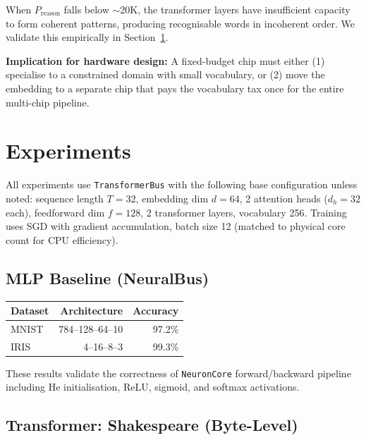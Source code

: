 \documentclass[11pt]{article}
\begin{document}
When $P_{\text{reason}}$ falls below $\sim$20K, the transformer layers have insufficient
capacity to form coherent patterns, producing recognisable words in incoherent order.
We validate this empirically in Section~\ref{sec:experiments}.

\textbf{Implication for hardware design:} A fixed-budget chip must either (1) specialise
to a constrained domain with small vocabulary, or (2) move the embedding to a separate chip
that pays the vocabulary tax once for the entire multi-chip pipeline.

\section{Experiments}

\label{sec:experiments}

All experiments use \texttt{TransformerBus} with the following base configuration
unless noted: sequence length $T=32$, embedding dim $d=64$, 2 attention heads
($d_h=32$ each), feedforward dim $f=128$, 2 transformer layers, vocabulary 256.
Training uses SGD with gradient accumulation, batch size 12 (matched to physical
core count for CPU efficiency).

\subsection{MLP Baseline (NeuralBus)}

\begin{center}
\begin{tabular}{lrr}
\toprule
Dataset & Architecture & Accuracy \\
\midrule
MNIST & 784--128--64--10 & 97.2\% \\
IRIS & 4--16--8--3 & 99.3\% \\
\bottomrule
\end{tabular}
\end{center}

These results validate the correctness of \texttt{NeuronCore} forward/backward pipeline
including He initialisation, ReLU, sigmoid, and softmax activations.

\subsection{Transformer: Shakespeare (Byte-Level)}
\end{document}
